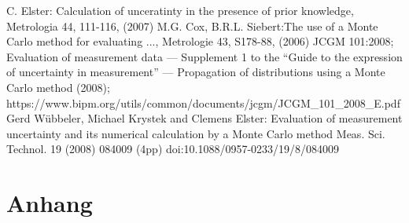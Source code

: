 \begin{thebibliography}{------}
     C. Elster: Calculation of unceratinty
	in the presence of prior knowledge, Metrologia 44, 111-116, (2007)
     M.G. Cox, B.R.L. Siebert:The use of
    a Monte Carlo method for evaluating ..., Metrologie 43, S178-88,
    (2006)
    JCGM 101:2008; Evaluation of measurement data — Supplement 1 to the 
    “Guide to the expression of uncertainty in measurement” — 
    Propagation of distributions using a Monte Carlo method (2008); \newline 
    https://www.bipm.org/utils/common/documents/jcgm/JCGM\_101\_2008\_E.pdf
     Gerd Wübbeler, Michael Krystek and Clemens Elster: Evaluation of measurement uncertainty
    and its numerical calculation by a Monte Carlo method
    Meas. Sci. Technol. 19 (2008) 084009 (4pp)
    doi:10.1088/0957-0233/19/8/084009
    \end{thebibliography}

\newpage
\section*{Anhang}
